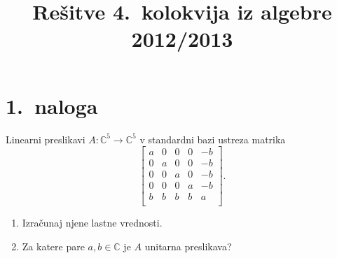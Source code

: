 \documentclass[a4,11pt]{article}
\title{Rešitve 4.~kolokvija iz algebre 2012/2013}
\author{}
\date{}
\begin{document}
\maketitle

\section*{1.~naloga}
    Linearni preslikavi \(A: \mathbb{C}^5 \to \mathbb{C}^5\) v standardni bazi ustreza matrika
    \[
        \begin{bmatrix}
            a & 0 & 0 & 0 & -b \\
            0 & a & 0 & 0 & -b \\
            0 & 0 & a & 0 & -b \\
            0 & 0 & 0 & a & -b \\
            b & b & b & b & a \\
        \end{bmatrix}.
    \]
    \begin{enumerate}[label=(\alph*)]
        \item Izračunaj njene lastne vrednosti.
        \item Za katere pare \(a, b \in \mathbb{C}\) je \(A\) unitarna preslikava?
    \end{enumerate}
\end{document}
